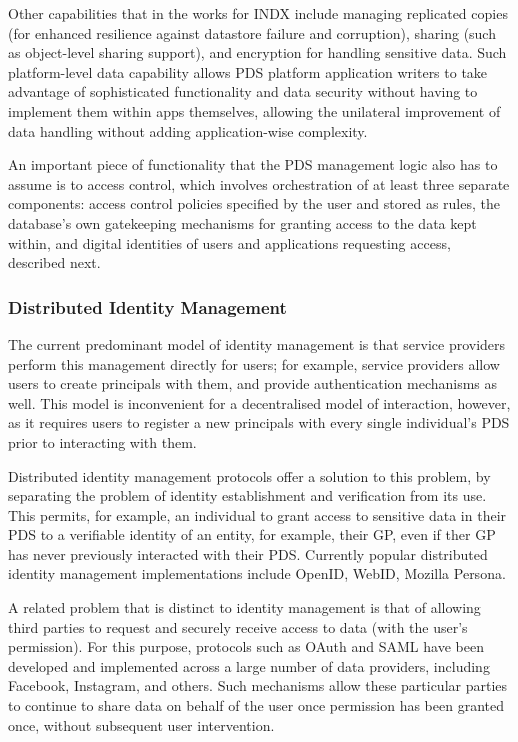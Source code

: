 \documentclass[graybox]{svmult}
\begin{document}
Other capabilities that in the works for INDX include managing replicated copies (for enhanced resilience against datastore failure and corruption), sharing (such as object-level sharing support), and encryption for handling sensitive data.  Such platform-level data capability allows PDS platform application writers to take advantage of sophisticated functionality and data security without having to implement them within apps themselves, allowing the unilateral improvement of data handling without adding application-wise complexity.

An important piece of functionality that the PDS management logic also has to assume is to access control, which involves orchestration of at least three separate components: access control policies specified by the user and stored as rules,  the database’s own gatekeeping mechanisms for granting access to the data kept within, and digital identities of users and applications requesting access, described next.

\subsubsection{Distributed Identity Management}
The current predominant model of identity management is that service providers perform this management directly for users; for example, service providers allow users to create principals with them, and provide authentication mechanisms as well.  This model is inconvenient for a decentralised model of interaction, however, as it requires users to register a new principals with every single individual’s PDS prior to interacting with them.

Distributed identity management protocols \cite{koshutanski2007distributed} offer a solution to this problem, by separating the problem of identity establishment and verification from its use.  This permits, for example, an individual to grant access to sensitive data in their PDS to a verifiable identity of an entity, for example, their GP, even if ther GP has never previously interacted with their PDS.  Currently popular distributed identity management implementations include OpenID\cite{openid}, WebID\cite{webid}, Mozilla Persona\cite{persona}.

A related problem that is distinct to identity management is that of allowing third parties to request and securely receive access to data (with the user’s permission).  For this purpose, protocols such as OAuth\cite{oauth} and SAML\cite{saml} have been developed and implemented across a large number of data providers, including Facebook, Instagram, and others.  Such mechanisms allow these particular parties to continue to share data on behalf of the user once permission has been granted once, without subsequent user intervention.  
\end{document}
